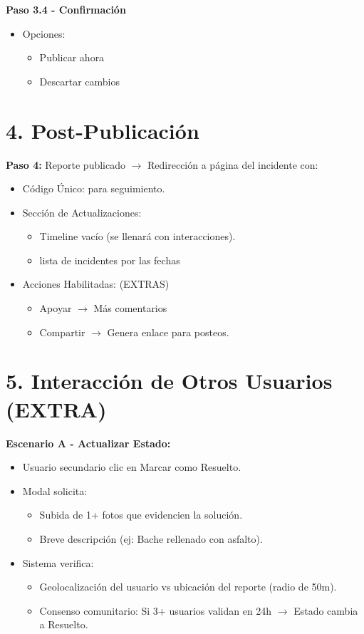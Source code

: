 \begin{multicols}{2}
\textbf{Paso 3.4 - Confirmación}
\begin{itemize}
    \item Opciones:
    \begin{itemize}
        \item Publicar ahora
        \item Descartar cambios
    \end{itemize}
\end{itemize}

\section*{4. Post-Publicación}

\textbf{Paso 4:} Reporte publicado $\rightarrow$ Redirección a página del incidente con:
\begin{itemize}
    \item Código Único: para seguimiento.
    \item Sección de Actualizaciones:
    \begin{itemize}
        \item Timeline vacío (se llenará con interacciones).
        \item lista de incidentes por las fechas
    \end{itemize}
    \item Acciones Habilitadas: (EXTRAS)
    \begin{itemize}
        \item Apoyar $\rightarrow$ Más comentarios
        \item Compartir $\rightarrow$ Genera enlace para posteos.
    \end{itemize}
\end{itemize}

\section*{5. Interacción de Otros Usuarios (EXTRA)}

\textbf{Escenario A - Actualizar Estado:}
\begin{itemize}
    \item Usuario secundario clic en Marcar como Resuelto.
    \item Modal solicita:
    \begin{itemize}
        \item Subida de 1+ fotos que evidencien la solución.
        \item Breve descripción (ej: Bache rellenado con asfalto).
    \end{itemize}
    \item Sistema verifica:
    \begin{itemize}
        \item Geolocalización del usuario vs ubicación del reporte (radio de 50m).
        \item Consenso comunitario: Si 3+ usuarios validan en 24h $\rightarrow$ Estado cambia a Resuelto.
    \end{itemize}
\end{itemize}


\end{multicols}
